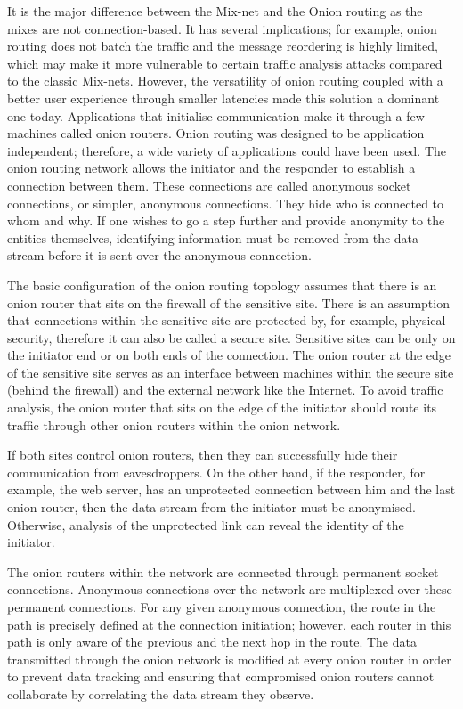 It is the major difference between the Mix-net and the Onion routing as the mixes are not connection-based. It has several implications; for example, onion routing does not batch the traffic and the message reordering is highly limited, which may make it more vulnerable to certain traffic analysis attacks compared to the classic Mix-nets. However, the versatility of onion routing coupled with a better user experience through smaller latencies made this solution a dominant one today.
Applications that initialise communication make it through a few machines called onion routers. Onion routing was designed to be application independent; therefore, a wide variety of applications could have been used. The onion routing network allows the initiator and the responder to establish a connection between them. These connections are called anonymous socket connections, or simpler, anonymous connections. They hide who is connected to whom and why. If one wishes to go a step further and provide anonymity to the entities themselves, identifying information must be removed from the data stream before it is sent over the anonymous connection.

The basic configuration of the onion routing topology assumes that there is an onion router that sits on the firewall of the sensitive site. There is an assumption that connections within the sensitive site are protected by, for example, physical security, therefore it can also be called a secure site. Sensitive sites can be only on the initiator end or on both ends of the connection. The onion router at the edge of the sensitive site serves as an interface between machines within the secure site (behind the firewall) and the external network like the Internet. To avoid traffic analysis, the onion router that sits on the edge of the initiator should route its traffic through other onion routers within the onion network.

If both sites control onion routers, then they can successfully hide their communication from eavesdroppers. On the other hand, if the responder, for example, the web server, has an unprotected connection between him and the last onion router, then the data stream from the initiator must be anonymised. Otherwise, analysis of the unprotected link can reveal the identity of the initiator.

The onion routers within the network are connected through permanent socket connections. Anonymous connections over the network are multiplexed over these permanent connections. For any given anonymous connection, the route in the path is precisely defined at the connection initiation; however, each router in this path is only aware of the previous and the next hop in the route. The data transmitted through the onion network is modified at every onion router in order to prevent data tracking and ensuring that compromised onion routers cannot collaborate by correlating the data stream they observe.

